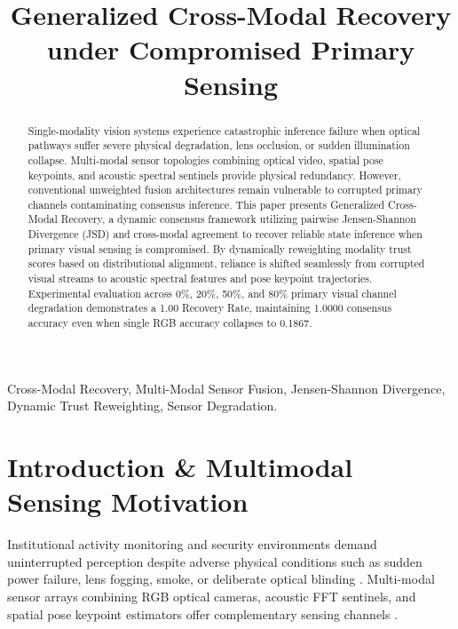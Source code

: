 \documentclass[conference]{IEEEtran}
\begin{document}
\title{Generalized Cross-Modal Recovery under Compromised Primary Sensing}

\author{
}

\maketitle

\begin{abstract}
Single-modality vision systems experience catastrophic inference failure when optical pathways suffer severe physical degradation, lens occlusion, or sudden illumination collapse. Multi-modal sensor topologies combining optical video, spatial pose keypoints, and acoustic spectral sentinels provide physical redundancy. However, conventional unweighted fusion architectures remain vulnerable to corrupted primary channels contaminating consensus inference. This paper presents Generalized Cross-Modal Recovery, a dynamic consensus framework utilizing pairwise Jensen-Shannon Divergence (JSD) and cross-modal agreement to recover reliable state inference when primary visual sensing is compromised. By dynamically reweighting modality trust scores based on distributional alignment, reliance is shifted seamlessly from corrupted visual streams to acoustic spectral features and pose keypoint trajectories. Experimental evaluation across 0\%, 20\%, 50\%, and 80\% primary visual channel degradation demonstrates a 1.00 Recovery Rate, maintaining 1.0000 consensus accuracy even when single RGB accuracy collapses to 0.1867.
\end{abstract}

\begin{IEEEkeywords}
Cross-Modal Recovery, Multi-Modal Sensor Fusion, Jensen-Shannon Divergence, Dynamic Trust Reweighting, Sensor Degradation.
\end{IEEEkeywords}

\section{Introduction & Multimodal Sensing Motivation}
Institutional activity monitoring and security environments demand uninterrupted perception despite adverse physical conditions such as sudden power failure, lens fogging, smoke, or deliberate optical blinding \cite{b1, b2, b3}. Multi-modal sensor arrays combining RGB optical cameras, acoustic FFT sentinels, and spatial pose keypoint estimators offer complementary sensing channels \cite{b4, b5}.
\end{document}
